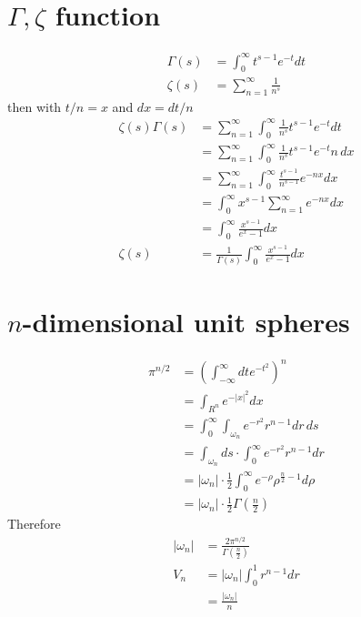 \documentclass[../main.tex]{subfiles}
\begin{document}
\section{\texorpdfstring{$\Gamma,\zeta $}{TEXT} function}
\begin{align}
    \Gamma(s)&=\int_0^\infty t^{s-1}e^{-t} dt\\
    \zeta(s)&=\sum_{n=1}^\infty\frac{1}{n^s}
\end{align}
then with $t/n=x$ and $dx=dt/n$
\begin{align}
	\zeta(s)\Gamma(s)
	&=\sum_{n=1}^\infty\int_0^\infty \frac{1}{n^s}t^{s-1}e^{-t} dt\\
	&=\sum_{n=1}^\infty\int_0^\infty \frac{1}{n^s}t^{s-1}e^{-t} n\,dx\\
	&=\sum_{n=1}^\infty\int_0^\infty \frac{t^{s-1}}{n^{s-1}}e^{-nx} dx\\
	&=\int_0^\infty x^{s-1}\sum_{n=1}^\infty e^{-nx} dx\\
	&=\int_0^\infty \frac{x^{s-1}}{e^{x}-1} dx\\
\zeta(s)&=\frac{1}{\Gamma(s)}\int_0^\infty \frac{x^{s-1}}{e^{x}-1} dx
\end{align}



\section{\texorpdfstring{$n$}{TEXT}-dimensional unit spheres}
\begin{align}
    \pi^{n/2}
    &=\left(\int_{-\infty}^\infty dt e^{-t^2}\right)^n\\
    &=\int_{R^n} e^{-|x|^2}dx\\
    &=\int_0^\infty\int_{\omega_n}e^{-r^2}r^{n-1}dr\,ds\\
    &=\int_{\omega_n}ds\cdot\int_0^\infty e^{-r^2}r^{n-1}dr\\
    &=|\omega_n|\cdot\frac{1}{2}\int_0^\infty e^{-\rho}\rho^{\frac{n}{2}-1}d\rho\\
    &=|\omega_n|\cdot\frac{1}{2}\Gamma\left(\frac{n}{2}\right)
\end{align}
Therefore
\begin{align}
|\omega_n| &= \frac{2\pi^{n/2}}{\Gamma\left(\frac{n}{2}\right)}\\
V_n 
&=|\omega_n|\int_0^1r^{n-1}dr\\
&=\frac{|\omega_n|}{n}
\end{align}
\end{document}
